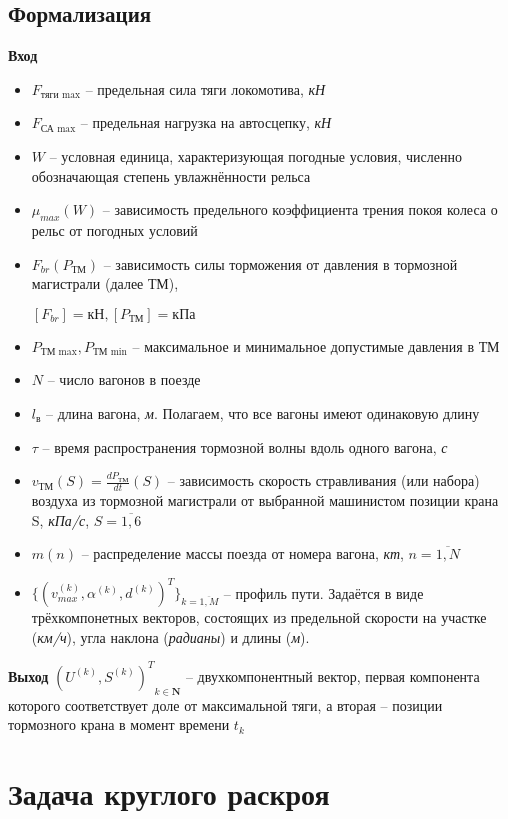 \subsection{Формализация}
\textbf{Вход}
\begin{itemize}
\item $F_{\text{тяги max}}$ -- предельная сила тяги локомотива, \textit{кН}
\item $F_{\text{СА max}}$ -- предельная нагрузка на автосцепку, \textit{кН}
\item $W$ -- условная единица, характеризующая погодные условия, численно обозначающая степень увлажнённости рельса
\item $\mu_{max}(W)$ -- зависимость предельного коэффициента трения покоя колеса о рельс от погодных условий
\item $F_{br}(P_{\text{ТМ}})$ -- зависимость силы торможения от давления в тормозной магистрали (далее ТМ),

$[F_{br}]=\text{кН}, [P_{\text{ТМ}}]=\text{кПа}$
\item $P_{\text{ТМ max}}, P_{\text{ТМ min}}$ -- максимальное и минимальное допустимые давления в ТМ
\item $N$ -- число вагонов в поезде
\item $l_{\text{в}}$ -- длина вагона, \textit{м}. Полагаем, что все вагоны имеют одинаковую длину
\item $\tau$ -- время распространения тормозной волны вдоль одного вагона,  \textit{с}
\item $v_{\text{ТМ}}(S)=\frac{dP_{ТМ}}{dt}(S)$ -- зависимость скорость стравливания (или набора) воздуха из тормозной магистрали от выбранной машинистом позиции крана S, \textit{кПа/с}, $S=\overline{1,6}$
\item $m(n)$ -- распределение массы поезда от номера вагона, \textit{кт}, $n=\overline{1, N}$
\item
$\{(v_{max}^{(k)}, \alpha^{(k)}, d^{(k)})^{T}\}_{k=\overline{1, M}}$ -- профиль пути. Задаётся в виде трёхкомпонетных векторов, состоящих из предельной скорости на участке (\textit{км/ч}), угла наклона (\textit{радианы}) и длины (\textit{м}).

\end{itemize}
\textbf{Выход}
${(U^{(k)}, S^{(k)})^{T}}_{k \in \mathbf{N}}$ -- двухкомпонентный вектор, первая компонента которого соответствует доле от максимальной тяги, а вторая -- позиции тормозного крана в момент времени $t_k$
\cite{shipTheory}

\section{Задача круглого раскроя}
